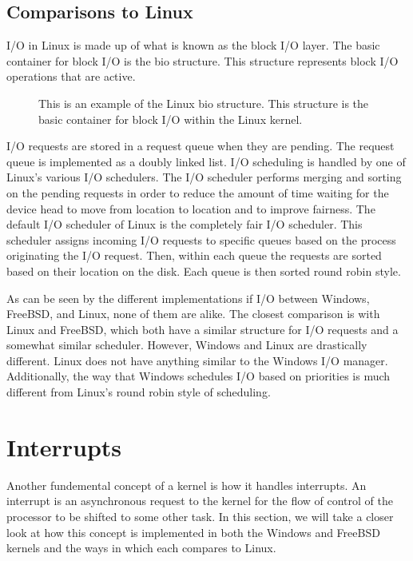 \documentclass[journal,letterpaper,draftclsnofoot,onecolumn,10pt]{IEEEtran}
\begin{document}
\subsection{Comparisons to Linux}

I/O in Linux is made up of what is known as the block I/O layer. The basic container for block I/O is the bio structure. This structure represents block I/O operations that are active.

\begin{figure}[H]
   
   \caption{This is an example of the Linux bio structure. This structure is the basic container for block I/O within the Linux kernel.}
\end{figure}

I/O requests are stored in a request queue when they are pending. The request queue is implemented as a doubly linked list. I/O scheduling is handled by one of Linux's various I/O schedulers. The I/O scheduler performs merging and sorting on the pending requests in order to reduce the amount of time waiting for the device head to move from location to location and to improve fairness. The default I/O scheduler of Linux is the completely fair I/O scheduler. This scheduler assigns incoming I/O requests to specific queues based on the process originating the I/O request. Then, within each queue the requests are sorted based on their location on the disk. Each queue is then sorted round robin style.\cite{l05}

As can be seen by the different implementations if I/O between Windows, FreeBSD, and Linux, none of them are alike. The closest comparison is with Linux and FreeBSD, which both have a similar structure for I/O requests and a somewhat similar scheduler. However, Windows and Linux are drastically different. Linux does not have anything similar to the Windows I/O manager. Additionally, the way that Windows schedules I/O based on priorities is much different from Linux's round robin style of scheduling.

\section{Interrupts}

Another fundemental concept of a kernel is how it handles interrupts. An interrupt is an asynchronous request to the kernel for the flow of control of the processor to be shifted to some other task. In this section, we will take a closer look at how this concept is implemented in both the Windows and FreeBSD kernels and the ways in which each compares to Linux.
\end{document}
